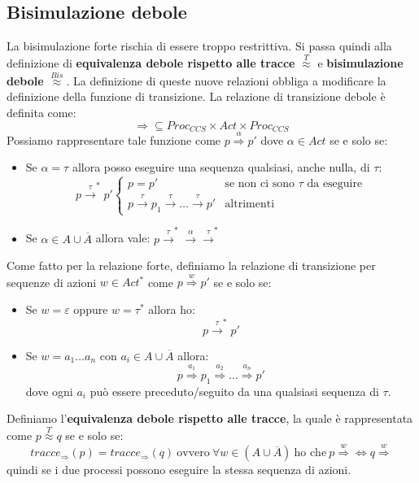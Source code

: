 \subsection{Bisimulazione debole}
La bisimulazione forte rischia di essere troppo restrittiva. Si passa quindi alla
definizione di \textbf{equivalenza debole rispetto alle tracce} $\stackrel{T}{\approx}$
e \textbf{bisimulazione debole} $\stackrel{Bis}{\approx}$.
La definizione di queste nuove relazioni obbliga a modificare la definizione
della funzione di transizione. La relazione di transizione debole è definita come:
\begin{equation}
    \Rightarrow \subseteq Proc_{CCS} \times Act \times Proc_{CCS}
\end{equation}
Possiamo rappresentare tale funzione come $p \stackrel{\alpha}{\Rightarrow} p'$ dove
$\alpha \in Act$ se e solo se:
\begin{itemize}
    \item Se $\alpha = \tau$ allora posso eseguire una sequenza qualsiasi, anche
          nulla, di $\tau$: $$p \xrightarrow{\tau}^{\ast} p'\begin{cases}
                  p = p'                                                                  & \text{se non ci sono } \tau \text{ da eseguire} \\
                  p \xrightarrow{\tau} p_1 \xrightarrow{\tau} \dots \xrightarrow{\tau} p' & \text{altrimenti}
              \end{cases}$$
    \item Se $\alpha \in A \cup \overline{A}$ allora vale:
          $p \xrightarrow{\tau}^{\ast} \xrightarrow{\alpha} \xrightarrow{\tau}^{\ast}$
\end{itemize}
Come fatto per la relazione forte, definiamo la relazione di transizione per
sequenze di azioni $w \in Act^{\ast}$ come $p \stackrel{w}{\Rightarrow} p'$ se e solo se:
\begin{itemize}
    \item Se $w = \varepsilon$ oppure $w = \tau^{\ast}$ allora ho: $$p \xrightarrow{\tau}^{\ast} p'$$
    \item Se $w = a_1\dots a_n$ con $a_i \in A \cup \overline{A}$ allora:
          $$p \stackrel{a_1}{\Rightarrow} p_1 \stackrel{a_2}{\Rightarrow} \dots \stackrel{a_n}{\Rightarrow} p'$$
          dove ogni $a_i$ può essere preceduto/seguito da una qualsiasi sequenza di $\tau$.
\end{itemize}
\begin{definizione}
    Definiamo l'\textbf{equivalenza debole rispetto alle tracce}, la quale è
    rappresentata come $p \stackrel{T}{\approx} q$ se e solo se:
    \begin{equation}
        tracce_{\Rightarrow} (p) = tracce_{\Rightarrow}(q) \ \text{ovvero} \
        \forall w \in (A \cup \overline{A}) \ \text{ho che} \ p \stackrel{w}{\Rightarrow}
        \iff q \stackrel{w}{\Rightarrow}
    \end{equation}
    quindi se i due processi possono eseguire la stessa sequenza di azioni.
\end{definizione}
